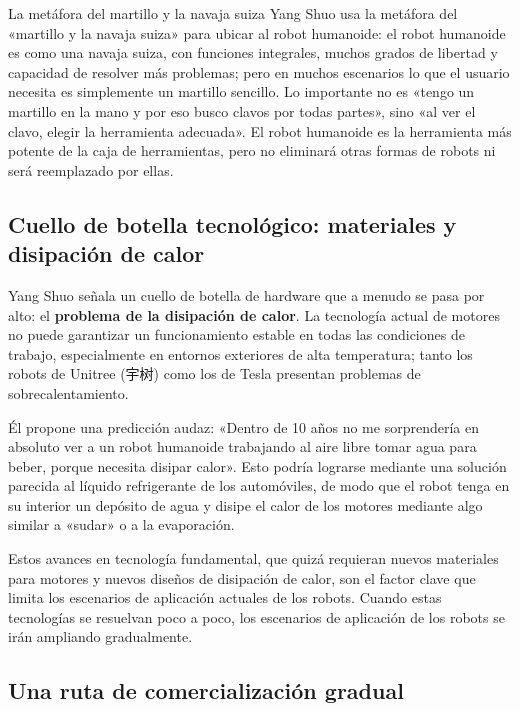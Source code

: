 \begin{warningbox}{La metáfora del martillo y la navaja suiza}
Yang Shuo usa la metáfora del «martillo y la navaja suiza» para ubicar al robot humanoide: el robot humanoide es como una navaja suiza, con funciones integrales, muchos grados de libertad y capacidad de resolver más problemas; pero en muchos escenarios lo que el usuario necesita es simplemente un martillo sencillo. Lo importante no es «tengo un martillo en la mano y por eso busco clavos por todas partes», sino «al ver el clavo, elegir la herramienta adecuada». El robot humanoide es la herramienta más potente de la caja de herramientas, pero no eliminará otras formas de robots ni será reemplazado por ellas.
\end{warningbox}

\subsection{Cuello de botella tecnológico: materiales y disipación de calor}

Yang Shuo señala un cuello de botella de hardware que a menudo se pasa por alto: el \textbf{problema de la disipación de calor}. La tecnología actual de motores no puede garantizar un funcionamiento estable en todas las condiciones de trabajo, especialmente en entornos exteriores de alta temperatura; tanto los robots de Unitree (宇树) como los de Tesla presentan problemas de sobrecalentamiento.

Él propone una predicción audaz: «Dentro de 10 años no me sorprendería en absoluto ver a un robot humanoide trabajando al aire libre tomar agua para beber, porque necesita disipar calor». Esto podría lograrse mediante una solución parecida al líquido refrigerante de los automóviles, de modo que el robot tenga en su interior un depósito de agua y disipe el calor de los motores mediante algo similar a «sudar» o a la evaporación.

Estos avances en tecnología fundamental, que quizá requieran nuevos materiales para motores y nuevos diseños de disipación de calor, son el factor clave que limita los escenarios de aplicación actuales de los robots. Cuando estas tecnologías se resuelvan poco a poco, los escenarios de aplicación de los robots se irán ampliando gradualmente.

\subsection{Una ruta de comercialización gradual}

